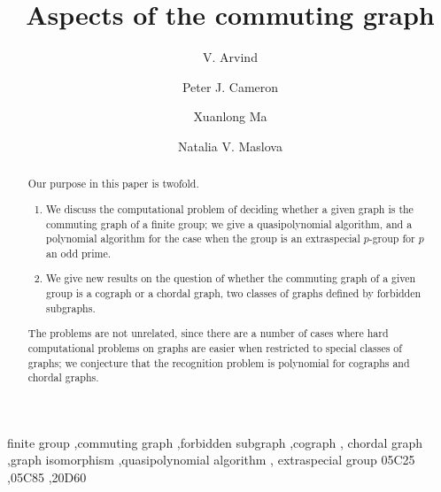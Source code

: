 \documentclass{elsarticle}
\begin{document}
\begin{frontmatter}
\title{Aspects of the commuting graph}
\author[1]{V. Arvind}
\author[2]{Peter J. Cameron}
\author[3]{Xuanlong Ma}
\author[4]{Natalia V. Maslova}

\address[1]{The Institute of Mathematical Sciences
    (HBNI), Chennai, India and Chennai Mathematical Institute,
    Siruseri, India}
\address[2]{School of Mathematics and Statistics, University of St Andrews,
    St Andrews, Fife KY16 9SS, UK}
\address[3]{School of Science, Xi'an Shiyou University, Xi'an 710065,
    P.R. China}
\address[4]{Krasovskii Institute of Mathematics and Mechanics UB RAS,
    Yekaterinburg, 620077, Russia, and Ural Federal University, Yekaterinburg,
    620002, Russia}


\begin{abstract}

Our purpose in this paper is twofold.
\begin{enumerate}
\item We discuss the computational problem of deciding whether a given graph
is the commuting graph of a finite group; we give a quasipolynomial algorithm,
and a polynomial algorithm for the case when the group is an extra\-special
$p$-group for $p$ an odd prime.
\item We give new results on the question of whether the commuting graph of
a given group is a cograph or a chordal graph, two classes of graphs defined
by forbidden subgraphs.
\end{enumerate}
The problems are not unrelated, since there are a number of cases where hard
computational problems on graphs are easier when restricted to special
classes of graphs; we conjecture that the recognition problem is polynomial
for cographs and chordal graphs.

\end{abstract}

\begin{keyword}
finite group \sep commuting graph \sep forbidden subgraph \sep cograph \sep
chordal graph \sep graph isomorphism \sep quasipolynomial algorithm \sep
extraspecial group
\MSC[2020] 05C25 \sep 05C85 \sep 20D60
\end{keyword}

\end{frontmatter}
\end{document}
